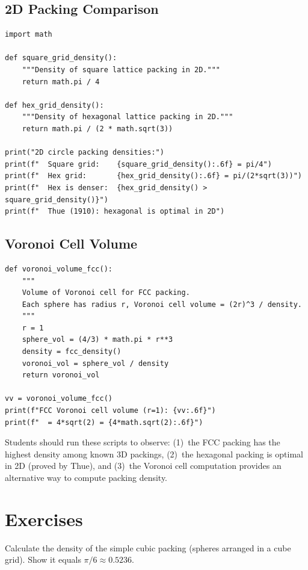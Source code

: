 \subsection{2D Packing Comparison}

\begin{verbatim}
import math

def square_grid_density():
    """Density of square lattice packing in 2D."""
    return math.pi / 4

def hex_grid_density():
    """Density of hexagonal lattice packing in 2D."""
    return math.pi / (2 * math.sqrt(3))

print("2D circle packing densities:")
print(f"  Square grid:    {square_grid_density():.6f} = pi/4")
print(f"  Hex grid:       {hex_grid_density():.6f} = pi/(2*sqrt(3))")
print(f"  Hex is denser:  {hex_grid_density() > square_grid_density()}")
print(f"  Thue (1910): hexagonal is optimal in 2D")
\end{verbatim}

\subsection{Voronoi Cell Volume}

\begin{verbatim}
def voronoi_volume_fcc():
    """
    Volume of Voronoi cell for FCC packing.
    Each sphere has radius r, Voronoi cell volume = (2r)^3 / density.
    """
    r = 1
    sphere_vol = (4/3) * math.pi * r**3
    density = fcc_density()
    voronoi_vol = sphere_vol / density
    return voronoi_vol

vv = voronoi_volume_fcc()
print(f"FCC Voronoi cell volume (r=1): {vv:.6f}")
print(f"  = 4*sqrt(2) = {4*math.sqrt(2):.6f}")
\end{verbatim}

\begin{highlightbox}
Students should run these scripts to observe: (1)~the FCC packing has the highest density among known 3D packings, (2)~the hexagonal packing is optimal in 2D (proved by Thue), and (3)~the Voronoi cell computation provides an alternative way to compute packing density.
\end{highlightbox}

\section{Exercises}

\begin{exercise}[Basic]
Calculate the density of the simple cubic packing (spheres arranged in a cube grid). Show it equals $\pi/6 \approx 0.5236$.
\end{exercise}

